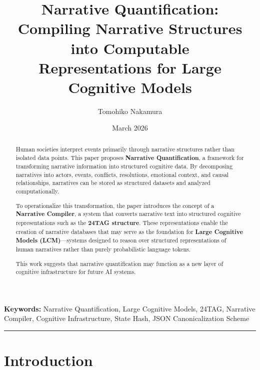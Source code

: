 \documentclass[11pt,a4paper]{article}
\begin{document}
\title{\textbf{Narrative Quantification:}\\
Compiling Narrative Structures into Computable\\
Representations for Large Cognitive Models}

\author[1]{Tomohiko Nakamura}

\date{March 2026}

\maketitle

\begin{abstract}
Human societies interpret events primarily through narrative structures
rather than isolated data points. This paper proposes \textbf{Narrative
Quantification}, a framework for transforming narrative information
into structured cognitive data. By decomposing narratives into actors,
events, conflicts, resolutions, emotional context, and causal
relationships, narratives can be stored as structured datasets and
analyzed computationally.

To operationalize this transformation, the paper introduces the concept
of a \textbf{Narrative Compiler}, a system that converts narrative text
into structured cognitive representations such as the \textbf{24TAG
structure}. These representations enable the creation of narrative
databases that may serve as the foundation for \textbf{Large Cognitive
Models (LCM)}---systems designed to reason over structured
representations of human narratives rather than purely probabilistic
language tokens.

This work suggests that narrative quantification may function as a new
layer of cognitive infrastructure for future AI systems.
\end{abstract}

\noindent\textbf{Keywords:} Narrative Quantification, Large Cognitive Models,
24TAG, Narrative Compiler, Cognitive Infrastructure, State Hash, JSON
Canonicalization Scheme

\hrule
\vspace{1em}

\section{Introduction}
\end{document}
